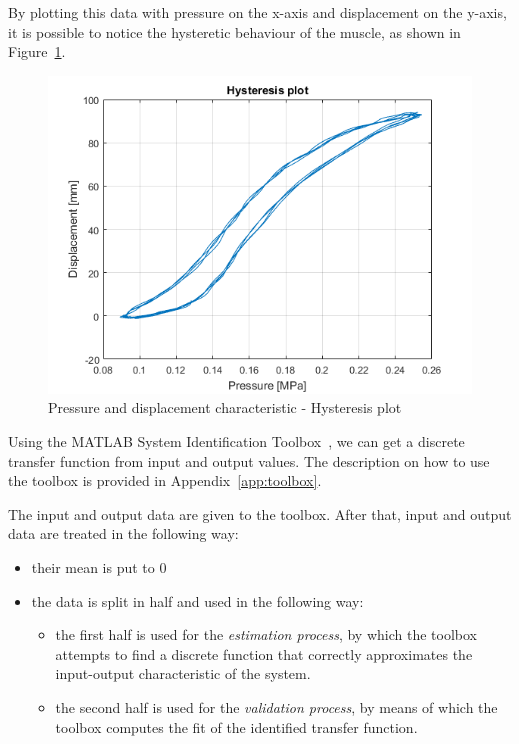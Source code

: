 By plotting this data with pressure on the x-axis and displacement on the y-axis,
it is possible to notice the hysteretic behaviour of the muscle,
as shown in Figure~\ref{fig:hysteresis_plot}.

\begin{figure}[H]
	\centering
	\includegraphics[width=\linewidth]{"Images/hysteresis_plot"}
	\caption[Pressure and displacement characteristic]{Pressure and displacement characteristic - Hysteresis plot}
	\label{fig:hysteresis_plot}
\end{figure}

Using the MATLAB System Identification Toolbox~\cite{ide_toolbox},
we can get a discrete transfer function from input and output values.
The description on how to use the toolbox is provided in Appendix~\ref{app:toolbox}.

The input and output data are given to the toolbox. 
After that, input and output data are treated in the following way:
\begin{itemize}
	\item their mean is put to 0
	\item the data is split in half and used in the following way:
	\begin{itemize}
		\item the first half is used for the \textit{estimation process},
		by which the toolbox attempts to find a discrete function
		that correctly approximates the input-output characteristic of the system.
		\item the second half is used for the \textit{validation process},
		by means of which the toolbox computes the fit of the identified transfer function.
	\end{itemize}
\end{itemize}  

